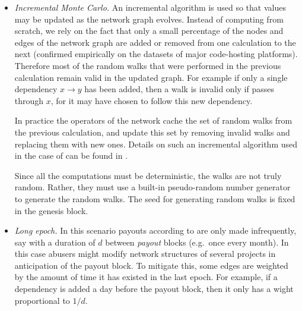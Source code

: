 \begin{itemize}
\item \emph{Incremental Monte Carlo.} An incremental algorithm is used
  so that \osrank{} values may be updated as the network graph
  evolves. Instead of computing \osrank{} from scratch, we rely on the
  fact that only a small percentage of the nodes and edges of the
  network graph are added or removed from one calculation to the next
  (confirmed empirically on the datasets of major code-hosting
  platforms). Therefore most of the random walks that were performed
  in the previous calculation remain valid in the updated graph. For
  example if only a single dependency $x \to y$ has been added, then a
  walk is invalid only if passes through $x$, for it may have chosen
  to follow this new dependency.

  In practice the operators of the network cache the set of random
  walks from the previous calculation, and update this set by removing
  invalid walks and replacing them with new ones. Details on such an
  incremental algorithm used in the case of \pagerank{} can be found
  in \cite{incr_pagerank}.

  Since all the computations must be deterministic, the walks are not
  truly random. Rather, they must use a built-in pseudo-random number
  generator to generate the random walks. The seed for generating
  random walks is fixed in the genesis block.


\item \emph{Long epoch.} In this scenario payouts according to
  \osrank{} are only made infrequently, say with a duration of $d$
  between \emph{payout} blocks (e.g.\ once every month). In this case
  abusers might modify network structures of several projects in
  anticipation of the payout block. To mitigate this, some edges are
  weighted by the amount of time it has existed in the last epoch. For
  example, if a dependency is added a day before the payout block,
  then it only has a wight proportional to $1/d$.
\end{itemize}
